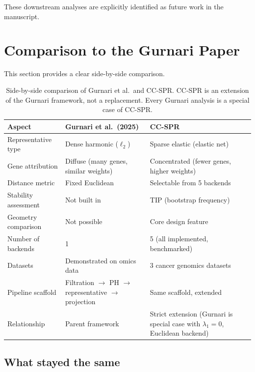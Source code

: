 \documentclass[11pt]{article}
\begin{document}
These downstream analyses are explicitly identified as future work in the manuscript.

\section{Comparison to the Gurnari Paper}
\label{sec:comparison}

This section provides a clear side-by-side comparison.

\begin{table}[h]
\centering
\small
\begin{tabular}{p{3.5cm}p{4.5cm}p{4.5cm}}
\toprule
\textbf{Aspect} & \textbf{Gurnari et al.\ (2025)} & \textbf{CC-SPR} \\
\midrule
Representative type & Dense harmonic ($\ell_2$) & Sparse elastic (elastic net) \\
Gene attribution & Diffuse (many genes, similar weights) & Concentrated (fewer genes, higher weights) \\
Distance metric & Fixed Euclidean & Selectable from 5 backends \\
Stability assessment & Not built in & TIP (bootstrap frequency) \\
Geometry comparison & Not possible & Core design feature \\
Number of backends & 1 & 5 (all implemented, benchmarked) \\
Datasets & Demonstrated on omics data & 3 cancer genomics datasets \\
Pipeline scaffold & Filtration $\to$ PH $\to$ representative $\to$ projection & Same scaffold, extended \\
Relationship & Parent framework & Strict extension (Gurnari is special case with $\lambda_1 = 0$, Euclidean backend) \\
\bottomrule
\end{tabular}
\caption{Side-by-side comparison of Gurnari et al.\ and CC-SPR.
CC-SPR is an extension of the Gurnari framework, not a replacement.
Every Gurnari analysis is a special case of CC-SPR.}
\label{tab:comparison}
\end{table}

\subsection{What stayed the same}
\end{document}
